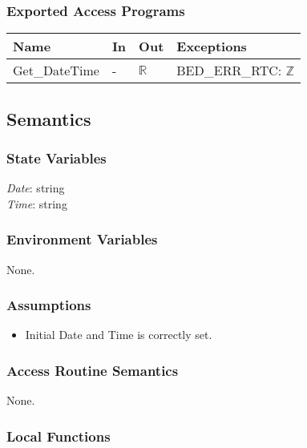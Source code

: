 \documentclass[12pt, titlepage]{article}
\begin{document}
\subsubsection{Exported Access Programs}

\begin{center}
\begin{tabular}{p{3cm} p{3cm} p{4cm} p{2cm}}
\hline
\textbf{Name} & \textbf{In} & \textbf{Out} & \textbf{Exceptions} \\
\hline
Get\_DateTime & - & $ \mathbb{R}$ & BED\_ERR\_RTC: $ \mathbb{Z}$ \\
\hline
\end{tabular}
\end{center}

\subsection{Semantics}

\subsubsection{State Variables}

\textit{Date}: string\\
\textit{Time}: string\\

\subsubsection{Environment Variables}

None.

\subsubsection{Assumptions}

\begin{itemize}
\item Initial Date and Time is correctly set.
\end{itemize}

\subsubsection{Access Routine Semantics}

None.

\subsubsection{Local Functions}
\end{document}
